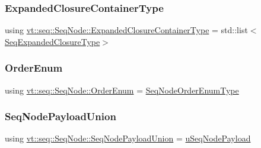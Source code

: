 \subsubsection{\texorpdfstring{Expanded\+Closure\+Container\+Type}{ExpandedClosureContainerType}}
{\footnotesize\ttfamily using \hyperlink{structvt_1_1seq_1_1_seq_node_aff21f386bb9bce2ce5c940edffcdb0a0}{vt\+::seq\+::\+Seq\+Node\+::\+Expanded\+Closure\+Container\+Type} =  std\+::list$<$\hyperlink{namespacevt_1_1seq_a322533ee3b8e3443e6808410aea39797}{Seq\+Expanded\+Closure\+Type}$>$}

\mbox{\label{structvt_1_1seq_1_1_seq_node_a1a934ba4a7da31ed1fa9c7789b8448ac}} 
\subsubsection{\texorpdfstring{Order\+Enum}{OrderEnum}}
{\footnotesize\ttfamily using \hyperlink{namespacevt_1_1seq_a313357c71bba2bea5c57f50d69f1edf7}{vt\+::seq\+::\+Seq\+Node\+::\+Order\+Enum} =  \hyperlink{namespacevt_1_1seq_a313357c71bba2bea5c57f50d69f1edf7}{Seq\+Node\+Order\+Enum\+Type}}

\mbox{\label{structvt_1_1seq_1_1_seq_node_a4550535aff445a28557a1edb9508a6bc}} 
\subsubsection{\texorpdfstring{Seq\+Node\+Payload\+Union}{SeqNodePayloadUnion}}
{\footnotesize\ttfamily using \hyperlink{structvt_1_1seq_1_1_seq_node_a4550535aff445a28557a1edb9508a6bc}{vt\+::seq\+::\+Seq\+Node\+::\+Seq\+Node\+Payload\+Union} =  \hyperlink{unionvt_1_1seq_1_1u_seq_node_payload}{u\+Seq\+Node\+Payload}}

\mbox{\label{structvt_1_1seq_1_1_seq_node_af2b8ae88c3519f2a6142915ddc974c9d}} 
